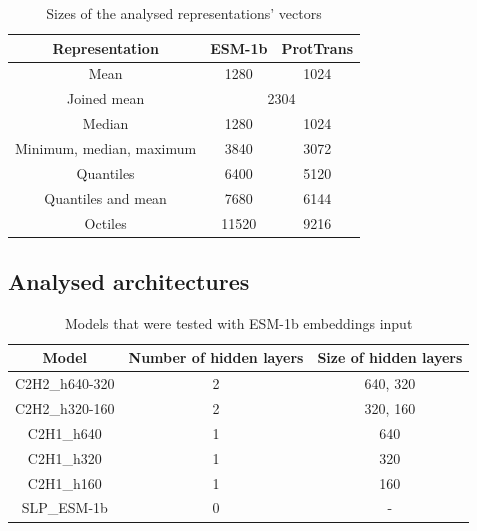 \documentclass[12pt]{article}
\begin{document}
	\begin{table}[h!]
		\caption{Sizes of the analysed representations' vectors}
		\vspace{0.2cm}
		\centering
		\begin{tabular}{ | c | c c | }
			\hline 
			Representation & ESM-1b & ProtTrans \\
			\hline 
			Mean & 1280 & 1024 \\
			Joined mean & \multicolumn{2}{c|}{2304} \\
			Median & 1280 & 1024 \\
			Minimum, median, maximum & 3840 & 3072 \\
			Quantiles & 6400 & 5120 \\
			Quantiles and mean & 7680 & 6144 \\
			Octiles & 11520 & 9216 \\
			\hline    
		\end{tabular}
		\label{table:vectorsDimensions}
	\end{table}

	\newpage

	\subsection{Analysed architectures}

	\begin{table}[h!]
		\caption{Models that were tested with ESM-1b embeddings input}
		\vspace{0.2cm}
		\centering
		\begin{tabular}{ | c | c c | }
			\hline 
			Model & Number of hidden layers & Size of hidden layers \\
			\hline 
			C2H2\_h640-320 & 2 & 640, 320 \\
			C2H2\_h320-160 & 2 & 320, 160 \\
			C2H1\_h640 & 1 & 640 \\
			C2H1\_h320 & 1 & 320 \\
			C2H1\_h160 & 1 & 160 \\
			SLP\_ESM-1b & 0 & - \\
			\hline    
		\end{tabular}
		\label{table:modelArchitecturesESM}
	\end{table}
\end{document}
